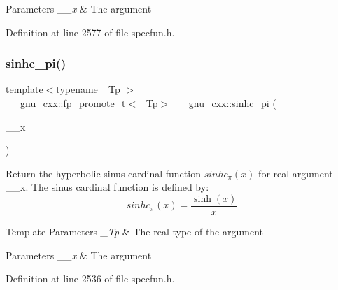 \begin{DoxyParams}{Parameters}
{\em \+\_\+\+\_\+x} & The argument \\
\hline
\end{DoxyParams}


Definition at line 2577 of file specfun.\+h.

\mbox{\label{group__gnu__math__spec__func_ga8bb6034e28d48879845bf64818cc06e1}} 
\subsubsection{\texorpdfstring{sinhc\+\_\+pi()}{sinhc\_pi()}}
{\footnotesize\ttfamily template$<$typename \+\_\+\+Tp $>$ \\
\+\_\+\+\_\+gnu\+\_\+cxx\+::fp\+\_\+promote\+\_\+t$<$\+\_\+\+Tp$>$ \+\_\+\+\_\+gnu\+\_\+cxx\+::sinhc\+\_\+pi (\begin{DoxyParamCaption}\item[{\+\_\+\+Tp}]{\+\_\+\+\_\+x }\end{DoxyParamCaption})\hspace{0.3cm}{\ttfamily [inline]}}

Return the hyperbolic sinus cardinal function $ sinhc_\pi(x) $ for real argument {\ttfamily \+\_\+\+\_\+x}. The sinus cardinal function is defined by\+: \[ sinhc_\pi(x) = \frac{\sinh(x)}{x} \]


\begin{DoxyTemplParams}{Template Parameters}
{\em \+\_\+\+Tp} & The real type of the argument \\
\hline
\end{DoxyTemplParams}

\begin{DoxyParams}{Parameters}
{\em \+\_\+\+\_\+x} & The argument \\
\hline
\end{DoxyParams}


Definition at line 2536 of file specfun.\+h.

\mbox{\label{group__gnu__math__spec__func_ga26e54504db6541550266140f5264acbe}} 
